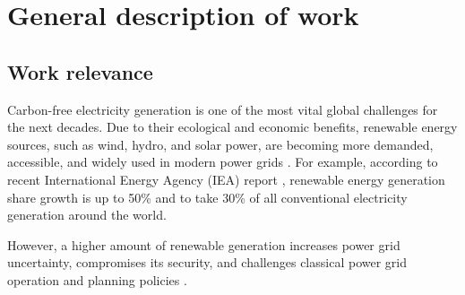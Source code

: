 \section*{General description of work} 


\subsection*{Work relevance} 

Carbon-free electricity generation is one of the most vital global challenges for the next decades. Due to their ecological and economic benefits, renewable energy sources, such as wind, hydro, and solar power, are becoming more demanded, accessible, and widely used in modern power grids \cite{harjanne2019abandoning}. For example, according to recent International Energy Agency (IEA) report \cite{iea2024electricity}, renewable energy generation share growth is up to 50\% and to take 30\% of all conventional electricity generation around the world.

However, a higher amount of renewable generation increases power grid uncertainty, compromises its security, and challenges classical power grid operation and planning policies \cite{koutsoyiannis2016unavoidable}. 

